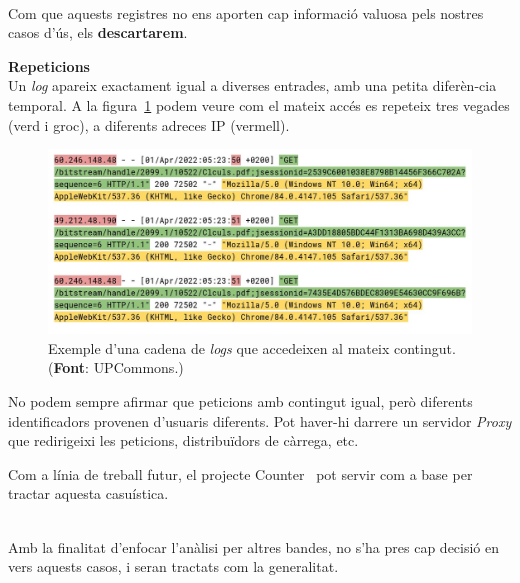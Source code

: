 \noindent \\
Com que aquests registres no ens aporten cap informació valuosa pels nostres casos d'ús, els \textbf{descartarem}.

\clearpage

\noindent
\textbf{Repeticions} \\

\noindent
Un \textit{\gls{log}} apareix exactament igual a diverses entrades, amb una petita diferèn-cia temporal.
A la figura~\ref{fig:log-repetitions} podem veure com el mateix accés es repeteix tres vegades (verd i groc), a diferents adreces \gls{IP} (vermell).

\begin{figure}[htbp]
    \centerline{\includegraphics[width=\textwidth]{figures/log-repetitions}}
    \captionsetup{justification=centering}
    \caption[Exemple d'una cadena de \textit{\gls{log}s} que accedeixen al mateix contingut.]{Exemple d'una cadena de \textit{\gls{log}s} que accedeixen al mateix contingut. (\textbf{Font}: \gls{UPCommons}.)}\label{fig:log-repetitions}
\end{figure}

\begin{tcolorbox}[colback=green!5!white, colframe=green!50!black, title=Divergència relativa]
    No podem sempre afirmar que peticions amb contingut igual, però diferents identificadors provenen d'usuaris diferents.
    Pot haver-hi darrere un servidor \textit{Proxy} que redirigeixi les peticions, distribuïdors de càrrega, etc.
\end{tcolorbox}

\noindent
\begin{tcolorbox}[colback=blue!5!white, colframe=blue!75!black, title=Counter]
    Com a línia de treball futur, el projecte Counter~\cite{counter} pot servir com a base per tractar aquesta casuística.
\end{tcolorbox}

\noindent \\
Amb la finalitat d'enfocar l'anàlisi per altres bandes, no s'ha pres cap decisió en vers aquests casos, i seran tractats com la generalitat.

